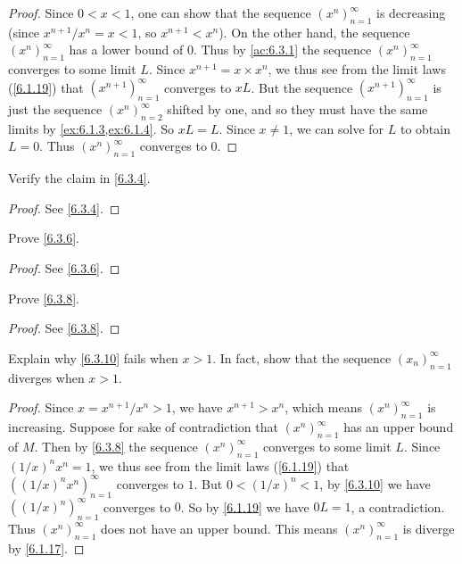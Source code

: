 \begin{proof}
  Since \(0 < x < 1\), one can show that the sequence \((x^n)_{n = 1}^\infty\) is decreasing
  (since \(x^{n + 1} / x^n = x < 1\), so \(x^{n + 1} < x^n\)).
  On the other hand, the sequence \((x^n)_{n = 1}^\infty\) has a lower bound of \(0\).
  Thus by \cref{ac:6.3.1} the sequence \((x^n)_{n = 1}^\infty\) converges to some limit \(L\).
  Since \(x^{n + 1} = x \times x^n\), we thus see from the limit laws (\cref{6.1.19}) that \((x^{n + 1})_{n = 1}^\infty\) converges to \(xL\).
  But the sequence \((x^{n + 1})_{n = 1}^\infty\) is just the sequence \((x^n)_{n = 2}^\infty\) shifted by one, and so they must have the same limits by \cref{ex:6.1.3,ex:6.1.4}.
  So \(xL = L\).
  Since \(x \neq 1\), we can solve for \(L\) to obtain \(L = 0\).
  Thus \((x^n)_{n = 1}^\infty\) converges to \(0\).
\end{proof}

\exercisesection

\begin{ex}\label{ex:6.3.1}
  Verify the claim in \cref{6.3.4}.
\end{ex}

\begin{proof}
  See \cref{6.3.4}.
\end{proof}

\begin{ex}\label{ex:6.3.2}
  Prove \cref{6.3.6}.
\end{ex}

\begin{proof}
  See \cref{6.3.6}.
\end{proof}

\begin{ex}\label{ex:6.3.3}
  Prove \cref{6.3.8}.
\end{ex}

\begin{proof}
  See \cref{6.3.8}.
\end{proof}

\begin{ex}\label{ex:6.3.4}
  Explain why \cref{6.3.10} fails when \(x > 1\).
  In fact, show that the sequence \((x_n)_{n = 1}^\infty\) diverges when \(x > 1\).
\end{ex}

\begin{proof}
  Since \(x = x^{n + 1} / x^n > 1\), we have \(x^{n + 1} > x^n\), which means \((x^n)_{n = 1}^\infty\) is increasing.
  Suppose for sake of contradiction that \((x^n)_{n = 1}^\infty\) has an upper bound of \(M\).
  Then by \cref{6.3.8} the sequence \((x^n)_{n = 1}^\infty\) converges to some limit \(L\).
  Since \((1 / x)^n x^n = 1\), we thus see from the limit laws (\cref{6.1.19}) that \(((1 / x)^n x^n)_{n = 1}^\infty\) converges to \(1\).
  But \(0 < (1 / x)^n < 1\), by \cref{6.3.10} we have \(((1 / x)^n)_{n = 1}^\infty\) converges to \(0\).
  So by \cref{6.1.19} we have \(0L = 1\), a contradiction.
  Thus \((x^n)_{n = 1}^\infty\) does not have an upper bound.
  This means \((x^n)_{n = 1}^\infty\) is diverge by \cref{6.1.17}.
\end{proof}

